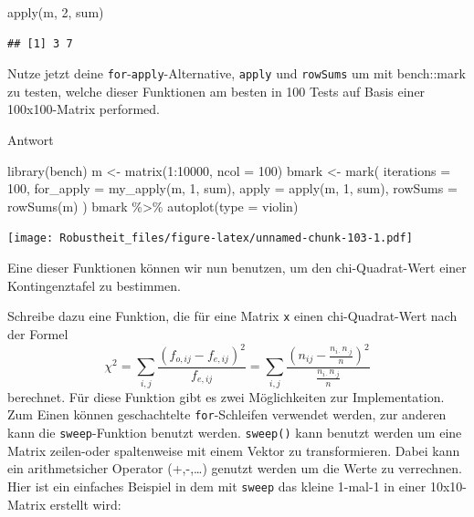 \documentclass[
]{book}
\newenvironment{Shaded}{\begin{snugshade}}{\end{snugshade}}
\newcommand{\AttributeTok}[1]{\textcolor[rgb]{0.77,0.63,0.00}{#1}}
\newcommand{\DecValTok}[1]{\textcolor[rgb]{0.00,0.00,0.81}{#1}}
\newcommand{\FunctionTok}[1]{\textcolor[rgb]{0.00,0.00,0.00}{#1}}
\newcommand{\NormalTok}[1]{#1}
\newcommand{\OtherTok}[1]{\textcolor[rgb]{0.56,0.35,0.01}{#1}}
\newcommand{\SpecialCharTok}[1]{\textcolor[rgb]{0.00,0.00,0.00}{#1}}
\newcommand{\StringTok}[1]{\textcolor[rgb]{0.31,0.60,0.02}{#1}}
\begin{document}
\begin{Shaded}
\begin{Highlighting}[]
\FunctionTok{apply}\NormalTok{(m, }\DecValTok{2}\NormalTok{, sum)}
\end{Highlighting}
\end{Shaded}

\begin{verbatim}
## [1] 3 7
\end{verbatim}

Nutze jetzt deine \texttt{for}-\texttt{apply}-Alternative, \texttt{apply} und \texttt{rowSums} um mit bench::mark zu testen, welche dieser Funktionen am besten in 100 Tests auf Basis einer 100x100-Matrix performed.

Antwort

\begin{Shaded}
\begin{Highlighting}[]
\FunctionTok{library}\NormalTok{(bench)}
\NormalTok{m }\OtherTok{\textless{}{-}} \FunctionTok{matrix}\NormalTok{(}\DecValTok{1}\SpecialCharTok{:}\DecValTok{10000}\NormalTok{, }\AttributeTok{ncol =} \DecValTok{100}\NormalTok{)}
\NormalTok{bmark }\OtherTok{\textless{}{-}} \FunctionTok{mark}\NormalTok{(}
  \AttributeTok{iterations =} \DecValTok{100}\NormalTok{,}
  \AttributeTok{for\_apply =} \FunctionTok{my\_apply}\NormalTok{(m, }\DecValTok{1}\NormalTok{, sum),}
  \AttributeTok{apply =} \FunctionTok{apply}\NormalTok{(m, }\DecValTok{1}\NormalTok{, sum),}
  \AttributeTok{rowSums =} \FunctionTok{rowSums}\NormalTok{(m)}
\NormalTok{)}
\NormalTok{bmark }\SpecialCharTok{\%\textgreater{}\%} 
  \FunctionTok{autoplot}\NormalTok{(}\AttributeTok{type =} \StringTok{\textquotesingle{}violin\textquotesingle{}}\NormalTok{)}
\end{Highlighting}
\end{Shaded}

\texttt{[image: Robustheit\_files/figure-latex/unnamed-chunk-103-1.pdf]}

Eine dieser Funktionen können wir nun benutzen, um den chi-Quadrat-Wert einer Kontingenztafel zu bestimmen.

Schreibe dazu eine Funktion, die für eine Matrix \texttt{x} einen chi-Quadrat-Wert nach der Formel \[\chi^2=\sum_{i,j}\frac{(f_{o,ij}-f_{e,ij})^2}{f_{e,ij}} = \sum_{i,j}\frac{\left(n_{ij}- \frac{n_{i\cdot} n_{\cdot j}}{n}\right)^2}{\frac{n_{i\cdot} n_{\cdot j}}{n}}\] berechnet.
Für diese Funktion gibt es zwei Möglichkeiten zur Implementation. Zum Einen können geschachtelte \texttt{for}-Schleifen verwendet werden, zur anderen kann die \texttt{sweep}-Funktion benutzt werden.
\texttt{sweep()} kann benutzt werden um eine Matrix zeilen-oder spaltenweise mit einem Vektor zu transformieren. Dabei kann ein arithmetsicher Operator (+,-,\ldots) genutzt werden um die Werte zu verrechnen. Hier ist ein einfaches Beispiel in dem mit \texttt{sweep} das kleine 1-mal-1 in einer 10x10-Matrix erstellt wird:
\end{document}
